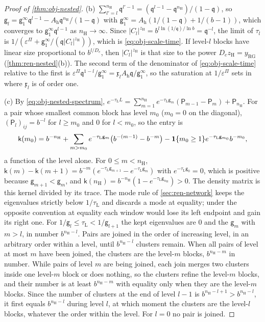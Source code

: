 \begin{proof}[Proof of \cref{thm:obj-nested}]
(b) $\sum_{l'=l}^{n_{\mathrm H}}\mathfrak q^{l'-1}=(\mathfrak q^{l-1}-\mathfrak q^{n_{\mathrm H}})/(1-\mathfrak q)$, so $\mathsf g_l=\mathsf g_1^\infty\mathfrak q^{l-1}-A_{\mathrm h}\mathfrak q^{n_{\mathrm H}}/(1-\mathfrak q)$ with $\mathsf g_1^\infty=A_{\mathrm h}(1/(1-\mathfrak q)+1/(b-1))$, which converges to $\mathsf g_1^\infty\mathfrak q^{l-1}$ as $n_{\mathrm H}\to\infty$. Since $\lvert C_l\rvert^{z_{\mathrm H}}=b^{l\ln(1/\mathfrak q)/\ln b}=\mathfrak q^{-l}$, the limit of $\tau_l$ is $1/(\varepsilon^\Pi+\mathsf g_1^\infty/(\mathfrak q\lvert C_l\rvert^{z_{\mathrm H}}))$, which is \eqref{eq:obj-scale-time}. If level-$l$ blocks have linear size proportional to $b^{l/D_e}$, then $\lvert C_l\rvert^{z_{\mathrm H}}$ is that size to the power $D_ez_{\mathrm H}=y_{\mathrm{RG}}$ (\cref{thm:ren-nested}(b)). The second term of the denominator of \eqref{eq:obj-scale-time} relative to the first is $\varepsilon^\Pi\mathfrak q^{1-l}/\mathsf g_1^\infty=\mathfrak x_lA_{\mathrm h}\mathfrak q/\mathsf g_1^\infty$, so the saturation at $1/\varepsilon^\Pi$ sets in where $\mathfrak x_l$ is of order one.

(c) By \eqref{eq:obj-nested-spectrum}, $e^{-\tau_{\mathrm L}L}=\sum_{m=1}^{n_{\mathrm H}}e^{-\tau_{\mathrm L}\mathsf g_m}(\mathsf P_{m-1}-\mathsf P_m)+\mathsf P_{n_{\mathrm H}}$. For a pair whose smallest common block has level $m_0$ ($m_0=0$ on the diagonal), $(\mathsf P_l)_{ij}=b^{-l}$ for $l\ge m_0$ and $0$ for $l<m_0$, so the entry is
\[
\mathsf k(m_0)=b^{-n_{\mathrm H}}+\sum_{m>m_0}e^{-\tau_{\mathrm L}\mathsf g_m}\bigl(b^{-(m-1)}-b^{-m}\bigr)-\mathbf{1}\{m_0\ge1\}e^{-\tau_{\mathrm L}\mathsf g_{m_0}}b^{-m_0},
\]
a function of the level alone. For $0\le m<n_{\mathrm H}$, $\mathsf k(m)-\mathsf k(m+1)=b^{-m}(e^{-\tau_{\mathrm L}\mathsf g_{m+1}}-e^{-\tau_{\mathrm L}\mathsf g_m})$ with $e^{-\tau_{\mathrm L}\mathsf g_0}=0$, which is positive because $\mathsf g_{m+1}<\mathsf g_m$, and $\mathsf k(n_{\mathrm H})=b^{-n_{\mathrm H}}(1-e^{-\tau_{\mathrm L}\mathsf g_{n_{\mathrm H}}})>0$. The density matrix is this kernel divided by its trace. The mode rule of \cref{sec:ren-network} keeps the eigenvalues strictly below $1/\tau_{\mathrm L}$ and discards a mode at equality; under the opposite convention at equality each window would lose its left endpoint and gain its right one. For $1/\mathsf g_l\le\tau_{\mathrm L}<1/\mathsf g_{l+1}$ the kept eigenvalues are $0$ and the $\mathsf g_m$ with $m>l$, in number $b^{n_{\mathrm H}-l}$. Pairs are joined in the order of increasing level, in an arbitrary order within a level, until $b^{n_{\mathrm H}-l}$ clusters remain. When all pairs of level at most $m$ have been joined, the clusters are the level-$m$ blocks, $b^{n_{\mathrm H}-m}$ in number. While pairs of level $m$ are being joined, each join merges two clusters inside one level-$m$ block or does nothing, so the clusters refine the level-$m$ blocks, and their number is at least $b^{n_{\mathrm H}-m}$ with equality only when they are the level-$m$ blocks. Since the number of clusters at the end of level $l-1$ is $b^{n_{\mathrm H}-l+1}>b^{n_{\mathrm H}-l}$, it first equals $b^{n_{\mathrm H}-l}$ during level $l$, at which moment the clusters are the level-$l$ blocks, whatever the order within the level. For $l=0$ no pair is joined.


\end{proof}

